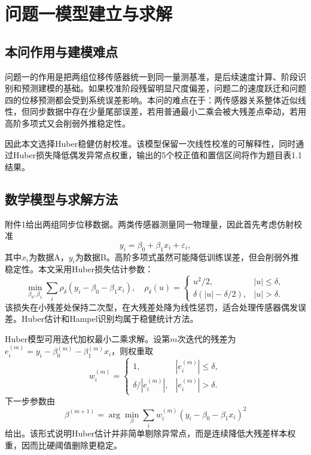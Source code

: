 \chapter{问题一模型建立与求解}

\section{本问作用与建模难点}

问题一的作用是把两组位移传感器统一到同一量测基准，是后续速度计算、阶段识别和预测建模的基础。如果校准阶段残留明显尺度偏差，问题二的速度跃迁和问题四的位移预测都会受到系统误差影响。本问的难点在于：两传感器关系整体近似线性，但同步数据中存在少量尾部误差，若用普通最小二乘会被大残差点牵动，若用高阶多项式又会削弱外推稳定性。

因此本文选择Huber稳健仿射校准。该模型保留一次线性校准的可解释性，同时通过Huber损失降低偶发异常点权重，输出的5个校正值和置信区间将作为题目表1.1结果。

\section{数学模型与求解方法}

附件1给出两组同步位移数据。两类传感器测量同一物理量，因此首先考虑仿射校准
\begin{equation}
  y_i=\beta_0+\beta_1x_i+\varepsilon_i ,
\end{equation}
其中$x_i$为数据A，$y_i$为数据B。高阶多项式虽然可能降低训练误差，但会削弱外推稳定性。本文采用Huber损失估计参数：
\begin{equation}
  \min_{\beta_0,\beta_1}\sum_i \rho_\delta(y_i-\beta_0-\beta_1x_i),
  \quad
  \rho_\delta(u)=
  \begin{cases}
    u^2/2, & |u|\leq \delta,\\
    \delta(|u|-\delta/2), & |u|>\delta.
  \end{cases}
\end{equation}
该损失在小残差处保持二次型，在大残差处降为线性惩罚，适合处理传感器偶发误差。Huber估计和Hampel识别均属于稳健统计方法\citep{hampel1974influence}。

Huber模型可用迭代加权最小二乘求解。设第$m$次迭代的残差为$e_i^{(m)}=y_i-\beta_0^{(m)}-\beta_1^{(m)}x_i$，则权重取
\begin{equation}
  w_i^{(m)}=
  \begin{cases}
    1, & |e_i^{(m)}|\leq\delta,\\
    \delta/|e_i^{(m)}|, & |e_i^{(m)}|>\delta.
  \end{cases}
\end{equation}
下一步参数由
\begin{equation}
  \beta^{(m+1)}=\arg\min_{\beta}\sum_i w_i^{(m)}(y_i-\beta_0-\beta_1x_i)^2
\end{equation}
给出。该形式说明Huber估计并非简单剔除异常点，而是连续降低大残差样本权重，因而比硬阈值删除更稳定。


